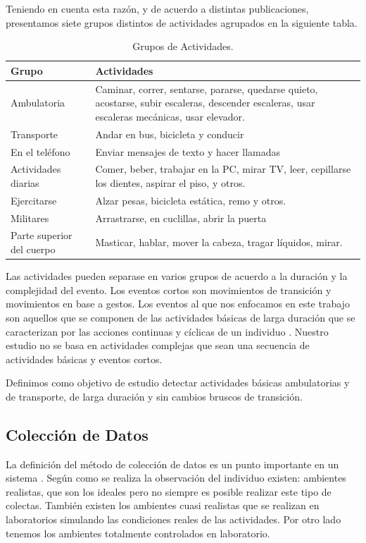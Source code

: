 Teniendo en cuenta esta razón, y de acuerdo a distintas publicaciones,
presentamos siete grupos distintos de actividades agrupados en la
siguiente tabla.

\begin{table}[htbp]
\centering{}%
\begin{tabular}{|l|p{9cm}|}
\hline 
\textbf{Grupo}  & \textbf{Actividades} \tabularnewline
\hline 
\hline 
Ambulatoria  & Caminar, correr, sentarse, pararse, quedarse quieto, acostarse, subir
escaleras, descender escaleras, usar escaleras mecánicas, usar elevador.\tabularnewline
\hline 
Transporte  & Andar en bus, bicicleta y conducir \tabularnewline
\hline 
En el teléfono  & Enviar mensajes de texto y hacer llamadas \tabularnewline
\hline 
Actividades diarias  & Comer, beber, trabajar en la PC, mirar TV, leer, cepillarse los dientes,
aspirar el piso, y otros. \tabularnewline
\hline 
Ejercitarse  & Alzar pesas, bicicleta estática, remo y otros. \tabularnewline
\hline 
Militares  & Arrastrarse, en cuclillas, abrir la puerta \tabularnewline
\hline 
Parte superior del cuerpo  & Masticar, hablar, mover la cabeza, tragar líquidos, mirar. \tabularnewline
\hline 
\end{tabular}\caption{Grupos de Actividades.}
\label{tabla:sencilla} 
\end{table}

Las actividades pueden separase en varios grupos de acuerdo a la duración
y la complejidad del evento. Los eventos cortos son movimientos de
transición y movimientos en base a gestos. Los eventos al que nos
enfocamos en este trabajo son aquellos que se componen de las actividades
básicas de larga duración que se caracterizan por las acciones continuas
y cíclicas de un individuo \cite{ReyesOrtiz2015}. Nuestro estudio
no se basa en actividades complejas que sean una secuencia de actividades
básicas y eventos cortos.

Definimos como objetivo de estudio detectar actividades básicas ambulatorias
y de transporte, de larga duración y sin cambios bruscos de transición.

\subsection{Colección de Datos}

La definición del método de colección de datos es un punto importante
en un sistema . Según como se realiza la observación del
individuo existen: ambientes realistas, que son los ideales pero no
siempre es posible realizar este tipo de colectas. También existen
los ambientes cuasi realistas que se realizan en laboratorios simulando
las condiciones reales de las actividades. Por otro lado tenemos los
ambientes totalmente controlados en laboratorio.

